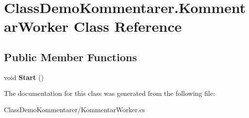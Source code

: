 \hypertarget{class_class_demo_kommentarer_1_1_kommentar_worker}{}\section{Class\+Demo\+Kommentarer.\+Kommentar\+Worker Class Reference}
\label{class_class_demo_kommentarer_1_1_kommentar_worker}
\subsection*{Public Member Functions}
\begin{DoxyCompactItemize}
\item 
\mbox{\label{class_class_demo_kommentarer_1_1_kommentar_worker_a69422c60de3ba2550b1b2158ce954ce2}} 
void {\bfseries Start} ()
\end{DoxyCompactItemize}


The documentation for this class was generated from the following file\+:\begin{DoxyCompactItemize}
\item 
Class\+Demo\+Kommentarer/Kommentar\+Worker.\+cs\end{DoxyCompactItemize}
